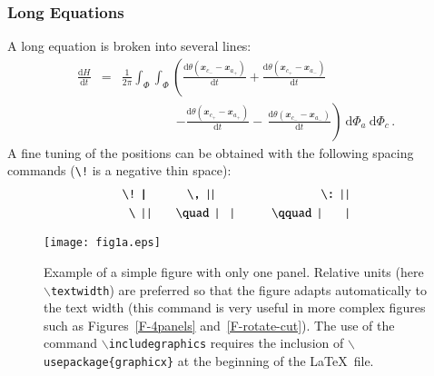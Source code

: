 \documentclass[namedreferences]{solarphysics}
\renewcommand{\vec}[1]{{\mathbfit #1}}
\newcommand{\deriv}[2]{\frac{{\mathrm d} #1}{{\mathrm d} #2}}
\newcommand{\rmd}{ {\ \mathrm d} }
\newcommand{\xx}{ \vec x}
\begin{document}
\begin{article}
{\subsubsection{Long Equations} %
  \label{S-long-equations}
 A long equation is broken into several lines:
      \begin{eqnarray}
      \deriv{H}{t} &=& 
                    \frac{1}{2 \pi} \int_{\Phi } \int_{\Phi }
                    \left(   \deriv{ \theta (\xx _{c_-} -\xx _{a_+}) }{t}
                           + \deriv{ \theta (\xx _{c_+} -\xx _{a_-}) }{t}
                    \right.                            \nonumber  \\
       && \qquad \qquad \;
                    \left. - \deriv{ \theta (\xx _{c_+} -\xx _{a_+}) }{t}
                         -\, \deriv{ \theta (\xx _{c_-} -\xx _{a_-}) }{t}
                    \right) 
                    \rmd \Phi_{a} \rmd \Phi_{c}  \,. \label{Eq-dH-Phi}
      \end{eqnarray}
A fine tuning of the positions can be obtained with the following spacing commands
(\verb+\!+ is a negative thin space):
     \begin{eqnarray} 
     \verb+\! + |\!| \,\  \qquad &    \! \verb+  \, + |\,|    
                          & \qquad    \verb+    \: + |\:|       \nonumber \\
     \verb+\ + |\ |       \qquad &    \verb+\quad + |\quad| 
                          & \qquad    \verb+\qquad + |\qquad|   \nonumber  
     \end{eqnarray}


  \begin{figure}    %
   \centerline{\texttt{[image: fig1a.eps]}
              }
              \caption{Example of a simple figure with only one panel. 
Relative units (here \texttt{$\backslash$textwidth}) are preferred
so that the figure adapts automatically to the text width (this command is very useful
in more complex figures such as Figures~\ref{F-4panels} and~\ref{F-rotate-cut}).
The use of the command \texttt{$\backslash$includegraphics} requires the 
inclusion of \texttt{$\backslash$usepackage\{graphicx\}} at the beginning of the
\LaTeX\ file.
                      }
   \label{F-simple}
   \end{figure}

}
\end{article}
\end{document}
